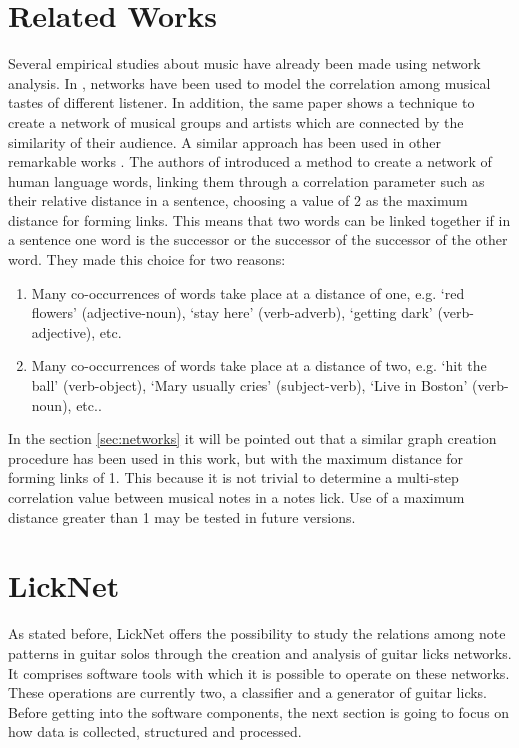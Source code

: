 \documentclass{llncs}
\begin{document}
\section{Related Works}
Several empirical studies about music have already been made using network analysis.
In \cite{music-genres}, networks have been
used to model the correlation among musical tastes of
different listener. In addition, the same paper shows a technique to
create a network of musical groups and artists which are connected by
the similarity of their audience. A similar approach has been used in
other remarkable works \cite{artists-network}\cite{metal-network}.
The authors of \cite{sw-words} introduced a method to create a network of human language words, linking
them through a correlation parameter such as their relative distance in
a sentence, choosing a value of 2 as the maximum distance for forming links. This
means that two words can be linked together if in a sentence one word is the
successor or the successor of the successor of the other word. They
made this choice for two reasons:
\begin{enumerate}
\item Many co-occurrences of
words take place at a distance of one, e.g. `red flowers' (adjective-noun), 
`stay here' (verb-adverb), `getting dark' (verb-adjective), etc. 
\item Many co-occurrences of words take place at a distance of two, e.g.
`hit the ball' (verb-object),
`Mary usually cries' (subject-verb), `Live in Boston' (verb-noun), etc..
\end{enumerate}
In the  section \ref{sec:networks} it will be pointed out  
that a similar graph creation procedure has been used in this work, but
with the maximum distance for forming links of 1. This because it is not
trivial
to determine a multi-step correlation value between musical notes in a
notes lick.
Use of a maximum distance greater than 1 may be tested in future versions.

\section{LickNet}
As stated before, LickNet offers the possibility to study the
relations among note patterns in guitar solos through the creation
and analysis of guitar licks networks. It comprises software tools with which
it is possible to operate on these networks.
These operations are currently two, a classifier and a generator of
guitar licks.\\
Before getting into the software components, the next section is going
to focus on how data is collected, structured and processed. 
\end{document}
